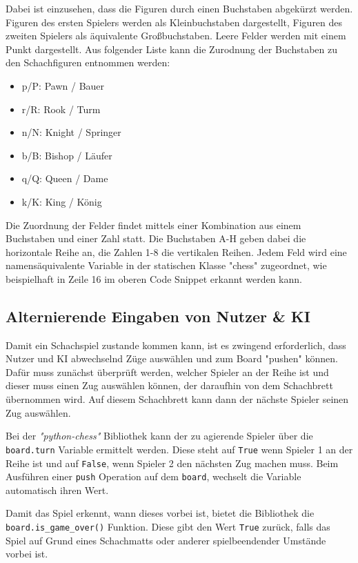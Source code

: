     Dabei ist einzusehen, dass die Figuren durch einen Buchstaben abgekürzt
werden. Figuren des ersten Spielers werden als Kleinbuchstaben
dargestellt, Figuren des zweiten Spielers als äquivalente
Großbuchstaben. Leere Felder werden mit einem Punkt dargestellt. Aus
folgender Liste kann die Zurodnung der Buchstaben zu den Schachfiguren
entnommen werden:

\begin{itemize}
\tightlist
\item
  p/P: Pawn / Bauer
\item
  r/R: Rook / Turm
\item
  n/N: Knight / Springer
\item
  b/B: Bishop / Läufer
\item
  q/Q: Queen / Dame
\item
  k/K: King / König
\end{itemize}

    Die Zuordnung der Felder findet mittels einer Kombination aus einem
Buchstaben und einer Zahl statt. Die Buchstaben A-H geben dabei die
horizontale Reihe an, die Zahlen 1-8 die vertikalen Reihen. Jedem Feld
wird eine namensäquivalente Variable in der statischen Klasse "chess"
zugeordnet, wie beispielhaft in Zeile 16 im oberen Code Snippet erkannt
werden kann.

    \subsection{Alternierende Eingaben von Nutzer \&
KI}\label{alternierende-eingaben-von-nutzer-ki}

Damit ein Schachspiel zustande kommen kann, ist es zwingend
erforderlich, dass Nutzer und KI abwechselnd Züge auswählen und zum
Board "pushen" können. Dafür muss zunächst überprüft werden, welcher
Spieler an der Reihe ist und dieser muss einen Zug auswählen können, der
daraufhin von dem Schachbrett übernommen wird. Auf diesem Schachbrett
kann dann der nächste Spieler seinen Zug auswählen.

Bei der \emph{"python-chess"} Bibliothek kann der zu agierende Spieler
über die \texttt{board.turn} Variable ermittelt werden. Diese steht auf
\texttt{True} wenn Spieler 1 an der Reihe ist und auf \texttt{False},
wenn Spieler 2 den nächsten Zug machen muss. Beim Ausführen einer
\texttt{push} Operation auf dem \texttt{board}, wechselt die Variable
automatisch ihren Wert.

Damit das Spiel erkennt, wann dieses vorbei ist, bietet die Bibliothek
die \texttt{board.is\_game\_over()} Funktion. Diese gibt den Wert
\texttt{True} zurück, falls das Spiel auf Grund eines Schachmatts oder
anderer spielbeendender Umstände vorbei ist.

